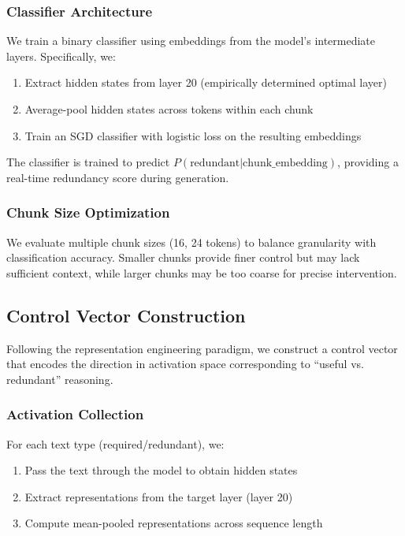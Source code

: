 \documentclass{article}
\begin{document}
\subsubsection{Classifier Architecture}

We train a binary classifier using embeddings from the model's intermediate layers. Specifically, we:

\begin{enumerate}
\item Extract hidden states from layer 20 (empirically determined optimal layer)
\item Average-pool hidden states across tokens within each chunk
\item Train an SGD classifier with logistic loss on the resulting embeddings
\end{enumerate}

The classifier is trained to predict $P(\text{redundant} | \text{chunk\_embedding})$, providing a real-time redundancy score during generation.

\subsubsection{Chunk Size Optimization}

We evaluate multiple chunk sizes (16, 24 tokens) to balance granularity with classification accuracy. Smaller chunks provide finer control but may lack sufficient context, while larger chunks may be too coarse for precise intervention.

\subsection{Control Vector Construction}

Following the representation engineering paradigm, we construct a control vector that encodes the direction in activation space corresponding to ``useful vs. redundant'' reasoning.

\subsubsection{Activation Collection}

For each text type (required/redundant), we:

\begin{enumerate}
\item Pass the text through the model to obtain hidden states
\item Extract representations from the target layer (layer 20)
\item Compute mean-pooled representations across sequence length
\end{enumerate}
\end{document}
